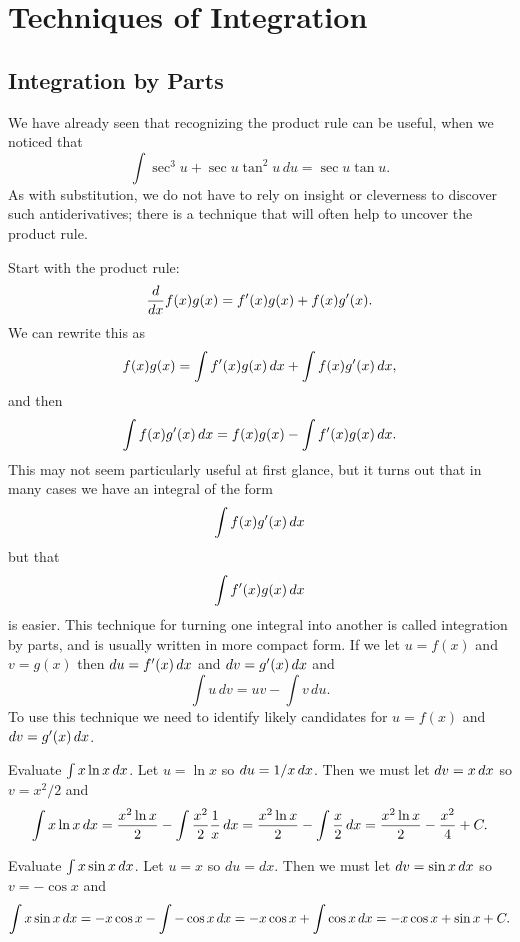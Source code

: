 \chapter{Techniques of Integration}

\section{Integration by Parts}


We have already seen that recognizing the product rule can be useful,
when we noticed that
$$\int \sec^3u+\sec u \tan^2u\,du=\sec u \tan u.$$
As with substitution, we do not have to rely on insight or cleverness
to discover such antiderivatives; there is a technique that will often
help to uncover the product rule.

Start with the product rule:
$$\frac{d}{dx} f(x)g(x)=f'(x)g(x)+f(x)g'(x).$$
We can rewrite this as
$$f(x)g(x)=\int f'(x)g(x)\, d x +\int f(x)g'(x)\, d x,$$
and then
$$\int f(x)g'(x)\, d x=f(x)g(x)-\int f'(x)g(x)\, d x.$$
This may not seem particularly useful at first glance, but it turns
out that in many cases we have an integral of the form
$$\int f(x)g'(x)\, d x$$
but that 
$$\int f'(x)g(x)\, d x$$
is easier. This technique for turning one integral into another is
called {\dfont integration by parts\/},
and is usually written in more compact form. If we let $u=f(x)$ and
$v=g(x)$ then $du=f'(x)\, d x$ and $dv=g'(x)\, d x$ and 
$$\int u\,dv = uv-\int v\,du.$$
To use this technique we need to identify likely candidates for
$u=f(x)$ and $dv=g'(x)\, d x$.

\begin{example}
Evaluate $\int x\ln x\, d x$. Let $u=\ln x$ so $du=1/x\, d x$. Then
we must let $dv=x\, d x$ so $v=x^2/2$ and
$$
 \int x\ln x\, d x={x^2\ln x\over 2}-\int {x^2\over2}{1\over x}\, d x=
 {x^2\ln x\over 2}-\int {x\over2}\, d x={x^2\ln x\over 2}-{x^2\over4}+C.
$$
\end{example}

\begin{example}
Evaluate $\int x\sin x\, d x$. Let $u=x$ so $du=dx$. Then
we must let $dv=\sin x\, d x$ so $v=-\cos x$ and
$$\int x\sin x\, d x=-x\cos x-\int -\cos x\, d x=
-x\cos x+\int \cos x\, d x=-x\cos x+\sin x+C.$$
\end{example}

